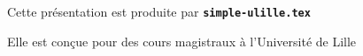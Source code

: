   \item Cette présentation est produite par \texttt{\textbf{simple-ulille.tex}}
  \item Elle est conçue pour des cours magistraux à l'Université de Lille
